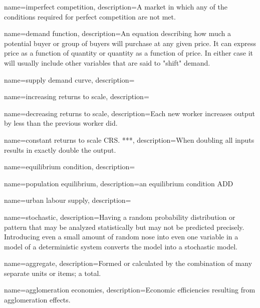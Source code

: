 {
name=imperfect competition,
description={A market in which any of the conditions required for \gls{perfect competition} are not met.}
}











{
name=demand function,
description={An equation describing how much a potential buyer or group of buyers will purchase at any given price. It can express price as a function of quantity or quantity as a function of price. In either case it will usually include other variables that are said to "shift" demand.   }
}

{
name=supply demand curve,
description={}
}

{
name=increasing returns to scale,
description={}
}

{
name=decreasing returns to scale,
description={Each new worker increases \gls{output} by less than the previous worker did.}
}

{
name=constant returns to scale \gls{CRS}. ***,
description={When doubling all \glspl{input} results in exactly double the \gls{output}. }
}

{
name=equilibrium condition,
description={}
}

{
name=population equilibrium,
description={an \gls{equilibrium condition} ADD}
}

{
name=urban labour supply,
description={}
}

{
name=stochastic,
description={Having a random probability distribution or pattern that may be analyzed statistically but may not be predicted precisely. Introducing even a small amount of random nose into even one variable in a model of a deterministic system converts the model into a stochastic model.}
}

{
name=aggregate,
description={Formed or calculated by the combination of many separate units or items; a total.}
}

{
name=agglomeration economies,
description={Economic efficiencies resulting from \gls{agglomeration effects}.}
}


